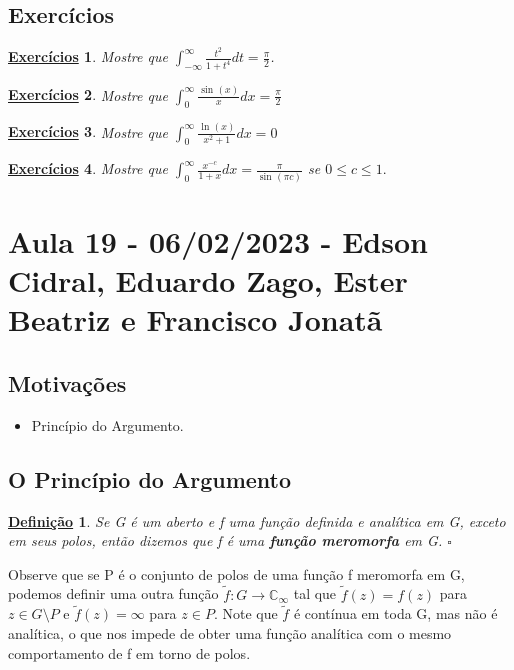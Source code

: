 \documentclass{article}
\newtheorem*{def*}{\underline{Defini\c c\~ao}}
\newtheorem*{exer*}{\underline{Exerc\'icios}}
\begin{document}
  \subsection{Exercícios}
 \begin{exer*}
   Mostre que \(\int_{-\infty}^{\infty}\frac{t^{2}}{1+t^{4}}dt = \frac{\pi }{2}\).
 \end{exer*}
 \begin{exer*}
   Mostre que \(\int_{0}^{\infty}\frac{\sin^{}{(x)}}{x}dx = \frac{\pi }{2}\)
 \end{exer*}
 \begin{exer*}
   Mostre que \(\int_{0}^{\infty}\frac{\ln^{}{(x)}}{x^{2}+1}dx = 0\)
 \end{exer*}
 \begin{exer*}
   Mostre que \(\int_{0}^{\infty}\frac{x^{-c}}{1+x}dx = \frac{\pi }{\sin^{}{(\pi c)}}\) se \(0 \leq c\leq 1.\)
 \end{exer*}
  \newpage

  \section{Aula 19 - 06/02/2023 - Edson Cidral, Eduardo Zago, Ester Beatriz e Francisco Jonatã}
  \subsection{Motivações}
  \begin{itemize}
    \item Princípio do Argumento.
  \end{itemize}
  \subsection{O Princípio do Argumento}
 \begin{def*}
   Se G é um aberto e f uma função definida e analítica em G, exceto em seus polos, então dizemos que f é uma \textbf{função meromorfa} em G. \(\square\)
 \end{def*}
 Observe que se P é o conjunto de polos de uma função f meromorfa em G, podemos definir uma outra função \(\tilde{f}:G\rightarrow \mathbb{C}_{\infty}\) tal que
 \(\tilde{f}(z) = f(z)\) para \(z\in G\setminus{P}\) e \(\tilde{f}(z) = \infty\) para \(z\in P\). Note que \(\tilde{f}\) é contínua em toda G, mas não é analítica,
 o que nos impede de obter uma função analítica com o mesmo comportamento de f em torno de polos.
\end{document}
